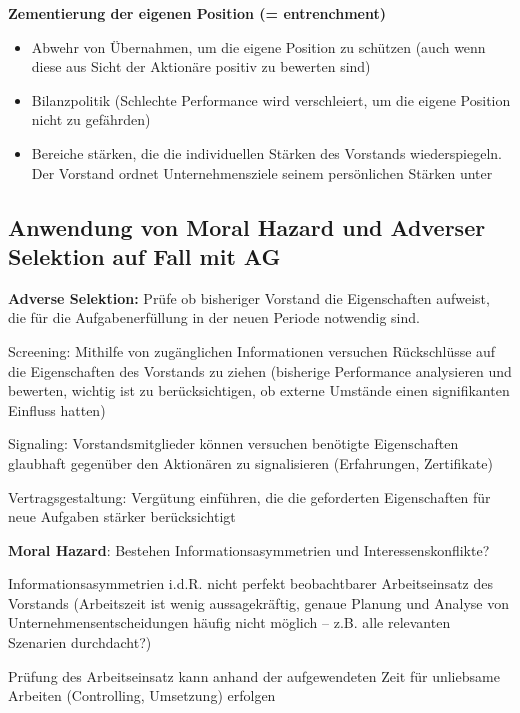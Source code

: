 \documentclass[
]{article}
\providecommand{\tightlist}{%
  \setlength{\itemsep}{0pt}\setlength{\parskip}{0pt}}
\begin{document}
\textbf{Zementierung der eigenen Position (= entrenchment)}

\begin{itemize}
\tightlist
\item
  Abwehr von Übernahmen, um die eigene Position zu schützen (auch wenn
  diese aus Sicht der Aktionäre positiv zu bewerten sind)
\item
  Bilanzpolitik (Schlechte Performance wird verschleiert, um die eigene
  Position nicht zu gefährden)
\item
  Bereiche stärken, die die individuellen Stärken des Vorstands
  wiederspiegeln. Der Vorstand ordnet Unternehmensziele seinem
  persönlichen Stärken unter
\end{itemize}

\hypertarget{anwendung-von-moral-hazard-und-adverser-selektion-auf-fall-mit-ag}{%
\subsection{Anwendung von Moral Hazard und Adverser Selektion auf Fall
mit
AG}\label{anwendung-von-moral-hazard-und-adverser-selektion-auf-fall-mit-ag}}

\textbf{Adverse Selektion:} Prüfe ob bisheriger Vorstand die
Eigenschaften aufweist, die für die Aufgabenerfüllung in der neuen
Periode notwendig sind.

Screening: Mithilfe von zugänglichen Informationen versuchen
Rückschlüsse auf die Eigenschaften des Vorstands zu ziehen (bisherige
Performance analysieren und bewerten, wichtig ist zu berücksichtigen, ob
externe Umstände einen signifikanten Einfluss hatten)

Signaling: Vorstandsmitglieder können versuchen benötigte Eigenschaften
glaubhaft gegenüber den Aktionären zu signalisieren (Erfahrungen,
Zertifikate)

Vertragsgestaltung: Vergütung einführen, die die geforderten
Eigenschaften für neue Aufgaben stärker berücksichtigt

\textbf{Moral Hazard}: Bestehen Informationsasymmetrien und
Interessenskonflikte?

Informationsasymmetrien i.d.R. nicht perfekt beobachtbarer
Arbeitseinsatz des Vorstands (Arbeitszeit ist wenig aussagekräftig,
genaue Planung und Analyse von Unternehmensentscheidungen häufig nicht
möglich -- z.B. alle relevanten Szenarien durchdacht?)

Prüfung des Arbeitseinsatz kann anhand der aufgewendeten Zeit für
unliebsame Arbeiten (Controlling, Umsetzung) erfolgen
\end{document}
